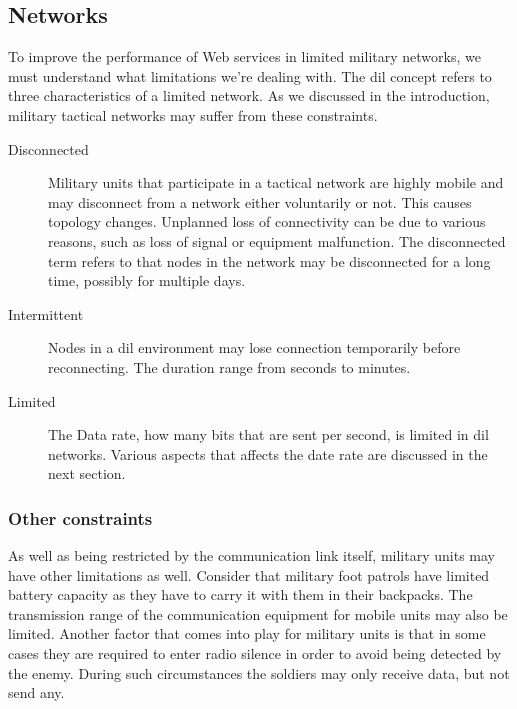 \subsection{ Networks}
\label{dil}

To improve the performance of Web services in limited military networks, we
must understand what limitations we're dealing with. The \gls{dil} concept refers
to three characteristics of a limited network. As we discussed in the
introduction, military tactical networks may suffer from these constraints.

\begin{description}
\item[Disconnected]
Military units that participate in a tactical network are highly mobile
and may disconnect from a network either voluntarily or not. This causes
topology changes. Unplanned loss of connectivity can be due to various reasons,
such as loss of signal or equipment malfunction.  The disconnected term refers
to that nodes in the network may be disconnected for a long time, possibly for
multiple days.

\item[Intermittent]

Nodes in a \gls{dil} environment may lose connection temporarily before
reconnecting. The duration range from seconds to minutes.

\item[Limited] The Data rate, how many bits that are sent per second, is limited
in \gls{dil} networks. Various aspects that affects the date rate are discussed
in the next section.

\end{description}

\subsubsection{Other constraints}

As well as being restricted  by the communication link itself, military units
may have other limitations as well. Consider that military foot patrols have
limited battery capacity as they have to carry it with them in their
backpacks. The transmission range of the communication equipment for mobile
units may also be limited. Another factor that comes into play for military
units is that in some cases they are required to enter radio silence in order
to avoid being detected by the enemy. During such circumstances the soldiers
may only receive data, but not send any.

